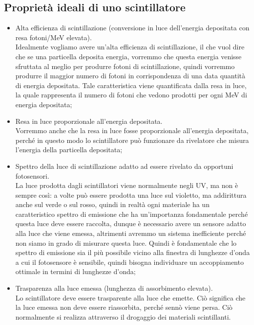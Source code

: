 \subsection{Proprietà ideali di uno scintillatore}
\begin{itemize}[leftmargin=0.5cm]
   \item Alta efficienza di scintillazione (conversione in luce dell'energia depositata con resa fotoni/MeV elevata).\\
   Idealmente vogliamo avere un'alta efficienza di scintillazione, il che vuol dire che se una particella deposita energia, vorremmo che questa energia venisse sfruttata al meglio per produrre fotoni di scintillazione, quindi vorremmo produrre il maggior numero di fotoni in corrispondenza di una data quantità di energia depositata. Tale caratteristica viene quantificata dalla resa in luce, la quale rappresenta il numero di fotoni che vedono prodotti per ogni MeV di energia depositata;
   \item Resa in luce proporzionale all'energia depositata.\\
   Vorremmo anche che la resa in luce fosse proporzionale all'energia depositata, perché in questo modo lo scintillatore può funzionare da rivelatore che misura l'energia della particella depositata;
   \item Spettro della luce di scintillazione adatto ad essere rivelato da opportuni fotosensori.\\
   La luce prodotta dagli scintillatori viene normalmente negli UV, ma non è sempre così: a volte può essere prodotta una luce sul violetto, ma addirittura anche sul verde o sul rosso, quindi in realtà ogni materiale ha un caratteristico spettro di emissione che ha un'importanza fondamentale perché questa luce deve essere raccolta, dunque è necessario avere un sensore adatto alla luce che viene emessa, altrimenti avremmo un sistema inefficiente perché non siamo in grado di misurare questa luce. Quindi è fondamentale che lo spettro di emissione sia il più possibile vicino alla finestra di lunghezze d'onda a cui il fotosensore è sensibile, quindi bisogna individuare un accoppiamento ottimale in termini di lunghezze d'onda;
   \item Trasparenza alla luce emessa (lunghezza di assorbimento elevata).\\
   Lo scintillatore deve essere trasparente alla luce che emette. Ciò significa che la luce emessa non deve essere riassorbita, perché sennò viene persa. Ciò normalmente si realizza attraverso il drogaggio dei materiali scintillanti.\\

\end{itemize}
